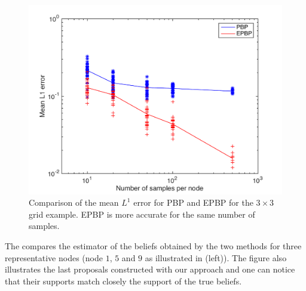 \begin{figure}[!h]
\center
\includegraphics[width=.6\textwidth]{figures/epbp/errComparison}
\caption{\label{figCompGrid}Comparison of the mean $L^{1}$ error for PBP and EPBP for the $3\times 3$ grid example. EPBP is more accurate for the same number of samples.} %
\end{figure}

The  compares the estimator of the beliefs obtained by the two methods for three representative nodes (node $1$, $5$ and $9$ as illustrated in  (left)). The figure also illustrates the last proposals constructed with our approach and one can notice that their supports match closely the support of the true beliefs.


